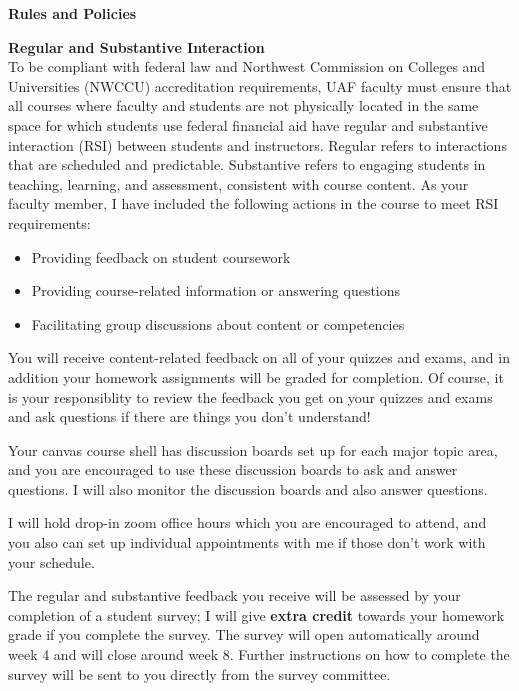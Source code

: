 \documentclass[11pt]{article}
\renewcommand{\emph}[1]{\textsf{\textbf{#1}}}
\newcommand{\localhead}[1]{\par\smallskip\textbf{#1} \smallskip\nobreak\\}%
\def\heading#1{\localhead{\large\emph{#1}}}
\def\subheading#1{\localhead{\emph{#1}}}
\begin{document}
\heading{Rules and Policies}

\subheading{Regular and Substantive Interaction}
To be compliant with federal law and Northwest Commission on Colleges and Universities (NWCCU) accreditation requirements, UAF faculty must ensure that all courses where faculty and students are not physically located in the same space for which students use federal financial aid have regular and substantive interaction (RSI) between students and instructors. Regular refers to interactions that are scheduled and predictable. Substantive refers to engaging students in teaching, learning, and assessment, consistent with course content. As your faculty member, I have included the following actions in the course to meet RSI requirements: 

\begin{itemize}[nosep]
\item Providing feedback on student coursework
\item Providing course-related information or answering questions
\item Facilitating group discussions about content or competencies
\end{itemize}

You will receive content-related feedback on all of your quizzes and exams, and in addition your homework assignments will be graded for completion. Of course, it is your responsiblity to review the feedback you get on your quizzes and exams and ask questions if there are things you don't understand!

Your canvas course shell has discussion boards set up for each major topic area, and you are encouraged to use these discussion boards to ask and answer questions. I will also monitor the discussion boards and also answer questions.

I will hold drop-in zoom office hours which you are encouraged to attend, and you also can set up individual appointments with me if those don't work with your schedule.

The regular and substantive feedback you receive will be assessed by your completion of a student survey; I will give \emph{extra credit} towards your homework grade if you complete the survey. The survey will open automatically around week 4 and will close around week 8. Further instructions on how to complete the survey will be sent to you directly from the survey committee.
\end{document}
